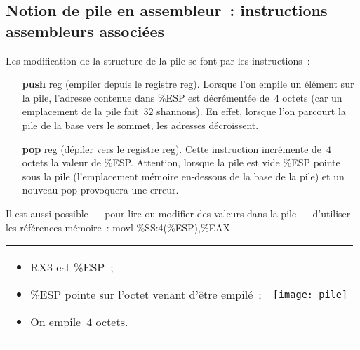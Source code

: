 \begin{frame}
  \section{Notion de pile en assembleur~: instructions assembleurs associ\'ees}
  Les modification de la structure de la pile se font par les
  instructions~:
  \begin{itemize}
  \item[\textbf{push} reg] (empiler depuis le registre reg).  Lorsque l'on
    empile un \'el\'ement sur la pile, l'adresse contenue dans \%ESP est 
    d\'ecr\'ement\'ee de~$4$ octets (car un emplacement de la pile
    fait~$32$ shannons).  En effet, lorsque l'on parcourt
    la pile de la base vers le sommet, les adresses d\'ecroissent.
  \item[\textbf{pop} reg] (d\'epiler vers le registre reg). Cette
    instruction incr\'emente de~$4$ octets la valeur de \%ESP.
    Attention, lorsque la pile est vide \%ESP pointe sous la pile
    (l'emplacement m\'emoire en-dessous de la base de la pile) et un
    nouveau pop provoquera une erreur.
  \end{itemize}
  \par\medskip
  Il est aussi possible --- pour lire ou modifier des valeurs dans la
  pile --- d'utiliser les r\'ef\'erences m\'emoire~: movl
  \%SS:4(\%ESP),\%EAX
  \newpage
  \begin{center}
    \begin{tabular}{lc}
      \begin{minipage}[b]{3.5cm}
        \begin{itemize}
        \item RX3 est \%ESP~;
        \item \%ESP pointe sur 
        l'octet venant d'\^etre 
        empil\'e~;
        \item On empile~$4$ octets.
        \end{itemize}
      \end{minipage}
      & \texttt{[image: pile]} \\
    \end{tabular}
  \end{center}
\end{frame}
